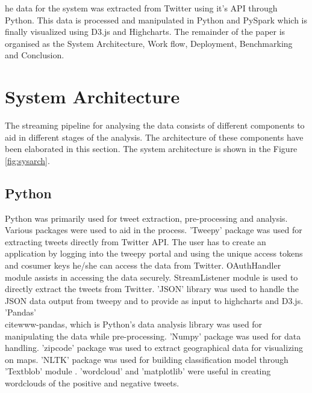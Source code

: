\documentclass[9pt,twocolumn,twoside]{styles/osajnl}
\begin{document}
he data for the system was extracted from Twitter using it's API through Python. This data is processed and manipulated in Python and PySpark which is finally visualized using D3.js and Highcharts. The remainder of the paper is organised as the System Architecture, Work flow, Deployment, Benchmarking and Conclusion. \section{System Architecture}
The streaming pipeline for analysing the data consists of different components to aid in different stages of the analysis. The architecture of these components have been elaborated in this section. The system architecture is shown in the Figure \ref{fig:sysarch}.
\subsection{Python}
Python was primarily used for tweet extraction, pre-processing and analysis. Various packages were used to aid in the process. 'Tweepy' package\cite{www-tweepy} was used for extracting tweets directly from Twitter API. The user has to create an application by logging into the tweepy portal and using the unique access tokens and cosumer keys he/she can access the data from Twitter. OAuthHandler module assists in accessing the data securely. StreamListener module is used to directly extract the tweets from Twitter. 'JSON' library \cite{www-json} was used to handle the JSON data output from tweepy and to provide as input to highcharts and D3.js. 'Pandas' \\cite{www-pandas}, which is Python's data analysis library was used for manipulating the data while pre-processing. 'Numpy' \cite{www-numpy} package was used for data handling. 'zipcode' \cite{www-zipcode} package was used to extract geographical data for visualizing on maps. 'NLTK' \cite{www-nltk} package was used for building classification model through 'Textblob' module \cite{www-textblob}. 'wordcloud' \cite{www-wordcloud} and 'matplotlib' \cite{www-matplotlib} were useful in creating wordclouds of the positive and negative tweets.   
\end{document}
